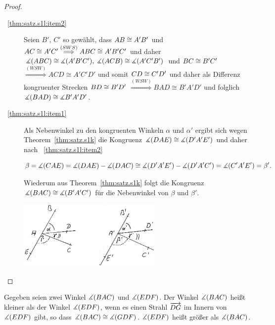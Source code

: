 \begin{proof}
    \begin{description}
        \item[~\ref{thm:satz.s1l:item2}] Seien $B',\, C'$ so gewählt, dass ${AB} \cong
            {A'B'}$ und ${AC} \cong {A'C'} \stackrel{(SWS)}{\Longrightarrow} ABC \cong
            A'B'C'$ und daher $\mbox{$\measuredangle$}(ABC) \cong \mbox{$\measuredangle$}(A'B'C'),\; \mbox{$\measuredangle$}(ACB) \cong \mbox{$\measuredangle$}(A'C'B')$ und
            ${BC} \cong {B'C'}$ $\stackrel{(WSW)}{\Longrightarrow} ACD \cong  A'C'D'$ und
            somit ${CD} \cong {C'D'}$ und daher als Differenz kongruenter Strecken ${BD}
            \cong {B'D'}$
            $\stackrel{(WSW)}{\Longrightarrow} BAD \cong B'A'D'$ und folglich $\mbox{$\measuredangle$}(BAD) \cong
            \mbox{$\measuredangle$}{B'A'D'}$.

        \item[~\ref{thm:satz.s1l:item1}] Als Nebenwinkel zu den kongruenten Winkeln $\alpha$ und
            $\alpha'$ ergibt sich wegen Theorem~\ref{thm:satz.s1k} die Kongruenz $\mbox{$\measuredangle$}(DAE) \cong
            \mbox{$\measuredangle$}(D'A'E')$ und daher nach ~\ref{thm:satz.s1l:item2}

            $$
                \beta = \mbox{$\measuredangle$}(CAE) = \mbox{$\measuredangle$}(DAE) - \mbox{$\measuredangle$}(DAC) \cong \mbox{$\measuredangle$}(D'A'E') - \mbox{$\measuredangle$}(D'A'C') = \mbox{$\measuredangle$}(C'A'E') =
                \beta'.
            $$

            Wiederum aus Theorem~\ref{thm:satz.s1k} folgt die Kongruenz $\mbox{$\measuredangle$}(BAC) \cong \mbox{$\measuredangle$}(B'A'C')$
            für die Nebenwinkel von $\beta$ und $\beta'$.

            \centerline{\includegraphics[width=7cm]{BILDER/1-2-15a-Winkel.jpg}}
    \end{description}
\end{proof}

\begin{defi}
    Gegeben seien zwei Winkel $\mbox{$\measuredangle$}(BAC)$ und $\mbox{$\measuredangle$}(EDF)$. Der Winkel $\mbox{$\measuredangle$}(BAC)$ heißt kleiner als der
    Winkel $\mbox{$\measuredangle$}(EDF)$, wenn es einen Strahl $\mbox{${\overrightarrow{DG}}$}$ im Innern von $\mbox{$\measuredangle$}(EDF)$ gibt, so dass
    $\mbox{$\measuredangle$}(BAC) \cong \mbox{$\measuredangle$}(GDF)$. $\mbox{$\measuredangle$}(EDF)$ heißt größer als $\mbox{$\measuredangle$}(BAC)$.
\end{defi}

